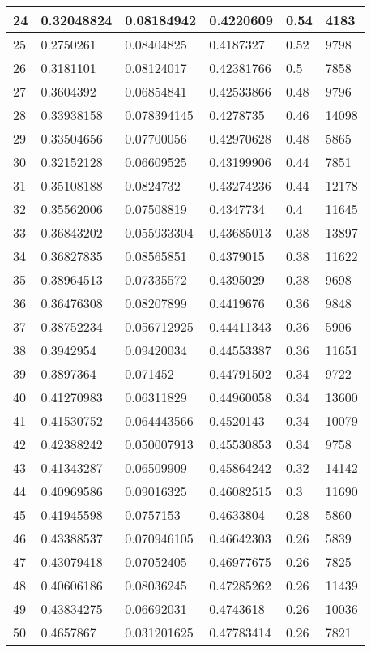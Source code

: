 \begin{longtable}{|l|l|l|l|l|l|}
24 & 0.32048824 & 0.08184942 & 0.4220609 & 0.54 & 4183 \\ \hline 
25 & 0.2750261 & 0.08404825 & 0.4187327 & 0.52 & 9798 \\ \hline 
26 & 0.3181101 & 0.08124017 & 0.42381766 & 0.5 & 7858 \\ \hline 
27 & 0.3604392 & 0.06854841 & 0.42533866 & 0.48 & 9796 \\ \hline 
28 & 0.33938158 & 0.078394145 & 0.4278735 & 0.46 & 14098 \\ \hline 
29 & 0.33504656 & 0.07700056 & 0.42970628 & 0.48 & 5865 \\ \hline 
30 & 0.32152128 & 0.06609525 & 0.43199906 & 0.44 & 7851 \\ \hline 
31 & 0.35108188 & 0.0824732 & 0.43274236 & 0.44 & 12178 \\ \hline 
32 & 0.35562006 & 0.07508819 & 0.4347734 & 0.4 & 11645 \\ \hline 
33 & 0.36843202 & 0.055933304 & 0.43685013 & 0.38 & 13897 \\ \hline 
34 & 0.36827835 & 0.08565851 & 0.4379015 & 0.38 & 11622 \\ \hline 
35 & 0.38964513 & 0.07335572 & 0.4395029 & 0.38 & 9698 \\ \hline 
36 & 0.36476308 & 0.08207899 & 0.4419676 & 0.36 & 9848 \\ \hline 
37 & 0.38752234 & 0.056712925 & 0.44411343 & 0.36 & 5906 \\ \hline 
38 & 0.3942954 & 0.09420034 & 0.44553387 & 0.36 & 11651 \\ \hline 
39 & 0.3897364 & 0.071452 & 0.44791502 & 0.34 & 9722 \\ \hline 
40 & 0.41270983 & 0.06311829 & 0.44960058 & 0.34 & 13600 \\ \hline 
41 & 0.41530752 & 0.064443566 & 0.4520143 & 0.34 & 10079 \\ \hline 
42 & 0.42388242 & 0.050007913 & 0.45530853 & 0.34 & 9758 \\ \hline 
43 & 0.41343287 & 0.06509909 & 0.45864242 & 0.32 & 14142 \\ \hline 
44 & 0.40969586 & 0.09016325 & 0.46082515 & 0.3 & 11690 \\ \hline 
45 & 0.41945598 & 0.0757153 & 0.4633804 & 0.28 & 5860 \\ \hline 
46 & 0.43388537 & 0.070946105 & 0.46642303 & 0.26 & 5839 \\ \hline 
47 & 0.43079418 & 0.07052405 & 0.46977675 & 0.26 & 7825 \\ \hline 
48 & 0.40606186 & 0.08036245 & 0.47285262 & 0.26 & 11439 \\ \hline 
49 & 0.43834275 & 0.06692031 & 0.4743618 & 0.26 & 10036 \\ \hline 
50 & 0.4657867 & 0.031201625 & 0.47783414 & 0.26 & 7821 \\ \hline 
\end{longtable}